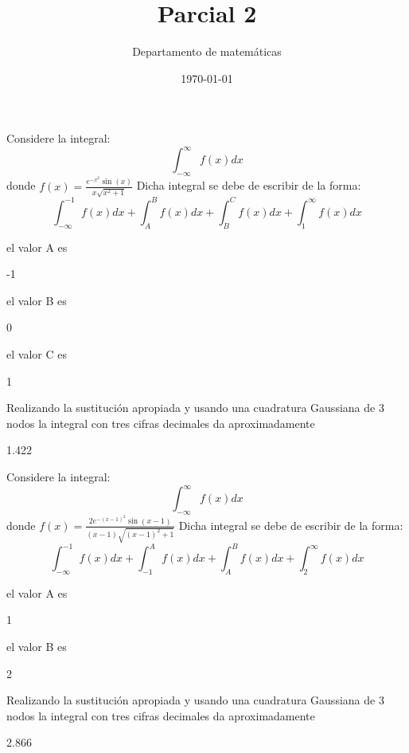 \documentclass{article}
\title{Parcial 2}
\author{Departamento de matemáticas}
\date{\today}
\begin{document}
	\maketitle
	\begin{quiz}{}
	\begin{cloze}{}
		Considere la integral:
		\[\displaystyle\int_{-\infty}^{\infty}f(x)dx\]
		donde $f(x) = \displaystyle\frac{e^{-x^2}\sin(x)}{x\sqrt{x^2+1}}$
		Dicha integral se debe de escribir de la forma:
		\[\displaystyle\int_{-\infty}^{-1}f(x)dx + \displaystyle\int_{A}^{B}f(x)dx+\displaystyle\int_{B}^{C}f(x)dx+ \displaystyle\int_{1}^{\infty}f(x)dx\]
	    \begin{numerical}[points=5]{}
	    	el valor A es \item -1
	    \end{numerical}
         \begin{numerical}[points=5]{}
        	el valor B es \item 0
        \end{numerical}
         \begin{numerical}[points=5]{}
        	el valor C es \item 1
        \end{numerical}
		\begin{numerical}[points=18]{}
			Realizando la sustituci\'on apropiada y usando una cuadratura Gaussiana de 3 nodos la integral con tres cifras decimales da aproximadamente \item[tolerance=0.003] 1.422
		\end{numerical}
	\end{cloze}
	\begin{cloze}{}
	Considere la integral:
	\[\displaystyle\int_{-\infty}^{\infty}f(x)dx\]
	donde $f(x) = \displaystyle\frac{2e^{-(x-1)^2}\sin(x-1)}{(x-1)\sqrt{(x-1)^2+1}}$
	Dicha integral se debe de escribir de la forma:
	\[\displaystyle\int_{-\infty}^{-1}f(x)dx + \displaystyle\int_{-1}^{A}f(x)dx +  \displaystyle\int_{A}^{B}f(x)dx + \displaystyle\int_{2}^{\infty}f(x)dx\]
	\begin{numerical}[points=8]{}
		el valor A es \item 1
	\end{numerical}
	\begin{numerical}[points=7]{}
		el valor B es \item 2
	\end{numerical}
	\begin{numerical}[points=18]{}
		Realizando la sustituci\'on apropiada y usando una cuadratura Gaussiana de 3 nodos la integral con tres cifras decimales da aproximadamente \item[tolerance=0.003] 2.866

\end{numerical}
\end{cloze}
\end{quiz}
\end{document}
